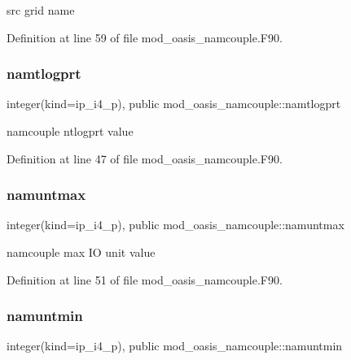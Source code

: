 src grid name 



Definition at line 59 of file mod\+\_\+oasis\+\_\+namcouple.\+F90.

\mbox{\label{namespacemod__oasis__namcouple_a45fbbd2941f5d71991d409f63e31cf02}} 
\subsubsection{\texorpdfstring{namtlogprt}{namtlogprt}}
{\footnotesize\ttfamily integer(kind=ip\+\_\+i4\+\_\+p), public mod\+\_\+oasis\+\_\+namcouple\+::namtlogprt}



namcouple ntlogprt value 



Definition at line 47 of file mod\+\_\+oasis\+\_\+namcouple.\+F90.

\mbox{\label{namespacemod__oasis__namcouple_ae750107f9401fd3c7348088ad3095b45}} 
\subsubsection{\texorpdfstring{namuntmax}{namuntmax}}
{\footnotesize\ttfamily integer(kind=ip\+\_\+i4\+\_\+p), public mod\+\_\+oasis\+\_\+namcouple\+::namuntmax}



namcouple max IO unit value 



Definition at line 51 of file mod\+\_\+oasis\+\_\+namcouple.\+F90.

\mbox{\label{namespacemod__oasis__namcouple_a1b8c7ce28c62fa0b15076b7169d8b454}} 
\subsubsection{\texorpdfstring{namuntmin}{namuntmin}}
{\footnotesize\ttfamily integer(kind=ip\+\_\+i4\+\_\+p), public mod\+\_\+oasis\+\_\+namcouple\+::namuntmin}



